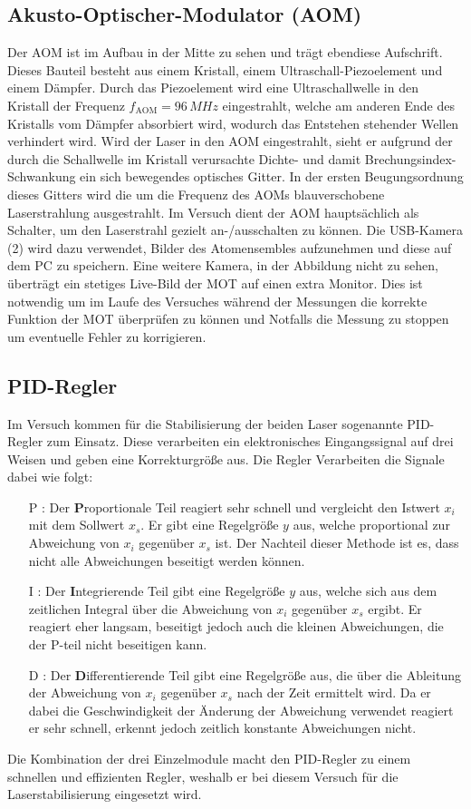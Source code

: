 \documentclass[twoside,colorback,accentcolor=tud4c,11pt]{tudreport}
\begin{document}
\subsection{Akusto-Optischer-Modulator (AOM)}
Der AOM ist im Aufbau in der Mitte zu sehen und trägt ebendiese Aufschrift. Dieses Bauteil besteht aus einem Kristall, einem Ultraschall-Piezoelement und einem Dämpfer. Durch das Piezoelement wird eine Ultraschallwelle in den Kristall der Frequenz $f_{\text{AOM}}=96\,\si{MHz}$ eingestrahlt, welche am anderen Ende des Kristalls vom Dämpfer absorbiert wird, wodurch das Entstehen stehender Wellen verhindert wird. Wird der Laser in den AOM eingestrahlt, sieht er aufgrund der durch die Schallwelle im Kristall verursachte Dichte- und damit Brechungsindex-Schwankung ein sich bewegendes optisches Gitter. In der ersten Beugungsordnung dieses Gitters wird die um die Frequenz des AOMs blauverschobene Laserstrahlung ausgestrahlt. Im Versuch dient der AOM hauptsächlich als Schalter, um den Laserstrahl gezielt an-/ausschalten zu können.
Die USB-Kamera (2) wird dazu verwendet, Bilder des Atomensembles aufzunehmen und diese auf dem PC zu speichern. Eine weitere Kamera, in der Abbildung nicht zu sehen, überträgt ein stetiges Live-Bild der MOT auf einen extra Monitor. Dies ist notwendig um im Laufe des Versuches während der Messungen die korrekte Funktion der MOT überprüfen zu können und Notfalls die Messung zu stoppen um eventuelle Fehler zu korrigieren.
\subsection{PID-Regler}
Im Versuch kommen für die Stabilisierung der beiden Laser sogenannte PID-Regler zum Einsatz. Diese verarbeiten ein elektronisches Eingangssignal auf drei Weisen und geben eine Korrekturgröße aus. Die Regler Verarbeiten die Signale dabei wie folgt:
\begin{itemize}
\item[P]: Der $\textbf{P}$roportionale Teil reagiert sehr schnell und vergleicht den Istwert $x_i$ mit dem Sollwert $x_s$. Er gibt eine Regelgröße $y$ aus, welche proportional zur Abweichung von $x_i$ gegenüber $x_s$ ist. Der Nachteil dieser Methode ist es, dass nicht alle Abweichungen beseitigt werden können.
\item[I]: Der $\textbf{I}$ntegrierende Teil gibt eine Regelgröße $y$ aus, welche sich aus dem zeitlichen Integral über die Abweichung von $x_i$ gegenüber $x_s$ ergibt. Er reagiert eher langsam, beseitigt jedoch auch die kleinen Abweichungen, die der P-teil nicht beseitigen kann.
\item[D]: Der $\textbf{D}$ifferentierende Teil gibt eine Regelgröße aus, die über die Ableitung der Abweichung von $x_i$ gegenüber $x_s$ nach der Zeit ermittelt wird. Da er dabei die Geschwindigkeit der Änderung der Abweichung verwendet reagiert er sehr schnell, erkennt jedoch zeitlich konstante Abweichungen nicht.
\end{itemize}
Die Kombination der drei Einzelmodule macht den PID-Regler zu einem schnellen und effizienten Regler, weshalb er bei diesem Versuch für die Laserstabilisierung eingesetzt wird.
\end{document}
